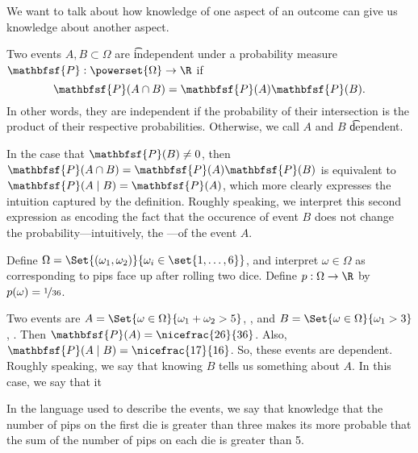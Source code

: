 
We want to talk about how knowledge of one aspect of an outcome can give us knowledge about another aspect.


Two events $A, B \subset \Omega $ are \t{independent} under a probability measure $\mathbfsf{P} : \powerset{\Omega } \to \R $ if
  \[
\mathbfsf{P} (A \cap B) = \mathbfsf{P} (A)\mathbfsf{P} (B).
  \]
In other words, they are independent if the probability of their intersection is the product of their respective probabilities.
Otherwise, we call $A$ and $B$ \t{dependent}.

In the case that $\mathbfsf{P} (B) \neq 0$, then $\mathbfsf{P} (A \cap B) = \mathbfsf{P} (A)\mathbfsf{P} (B)$ is equivalent to $\mathbfsf{P} (A \mid B) = \mathbfsf{P} (A)$, which more clearly expresses the intuition captured by the definition.
Roughly speaking, we interpret this second expression as encoding the fact that the occurence of event $B$ does not change the probability---intuitively, the ---of the event $A$.


Define $\Omega  = \Set{(\omega _1, \omega _2)}{ \omega _i \in \set{1, \dots , 6}}$, and interpret $\omega  \in \Omega $ as corresponding to pips face up after rolling two dice.
Define $p: \Omega  \to \R $ by $p(\omega ) = \nicefrac{1}{36}$.

Two events are $A = \Set{\omega  \in \Omega }{ \omega _1 + \omega _2 > 5}$, , and $B = \Set{\omega  \in \Omega }{\omega _1 > 3}$, .
Then $\mathbfsf{P} (A) = \nicefrac{26}{36}$.
Also, $\mathbfsf{P} (A \mid  B) = \nicefrac{17}{16}$.
So, these events are dependent.
Roughly speaking, we say that knowing $B$ tells us something about $A$.
In this case, we say that it 

In the language used to describe the events, we say that knowledge that the number of pips on the first die is greater than three makes its more probable that the sum of the number of pips on each die is greater than 5.

